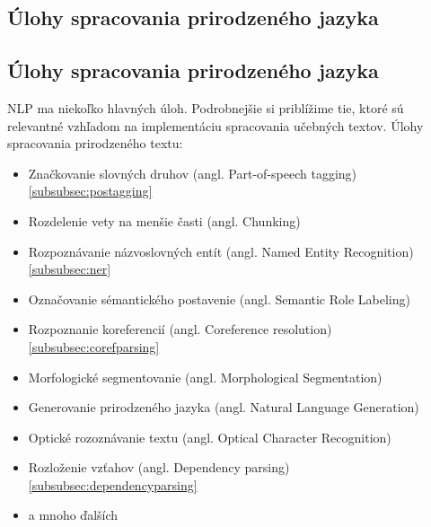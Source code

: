 %
%
{
	\subsection{Úlohy spracovania prirodzeného jazyka}
}
{
	\subsection{Úlohy spracovania prirodzeného jazyka}
}
\label{subsec:tasksofnlp}
NLP ma niekoľko hlavných úloh. Podrobnejšie si priblížime tie, ktoré sú relevantné vzhľadom na implementáciu spracovania učebných textov.
Úlohy spracovania prirodzeného textu:~\cite{collobert2011} 
\begin{itemize}
	\item Značkovanie slovných druhov (angl. Part-of-speech tagging) \ref{subsubsec:postagging}
	\item Rozdelenie vety na menšie časti (angl. Chunking)
	\item Rozpoznávanie názvoslovných entít (angl. Named Entity Recognition) \ref{subsubsec:ner}
	\item Označovanie sémantického postavenie (angl. Semantic Role Labeling)
	\item Rozpoznanie koreferencií (angl. Coreference resolution) \ref{subsubsec:corefparsing}
	\item Morfologické segmentovanie (angl. Morphological Segmentation)
	\item Generovanie prirodzeného jazyka (angl. Natural Language Generation)
	\item Optické rozoznávanie textu (angl. Optical Character Recognition)
	\item Rozloženie vzťahov (angl. Dependency parsing) \ref{subsubsec:dependencyparsing}
	\item a mnoho ďalších
\end{itemize}

